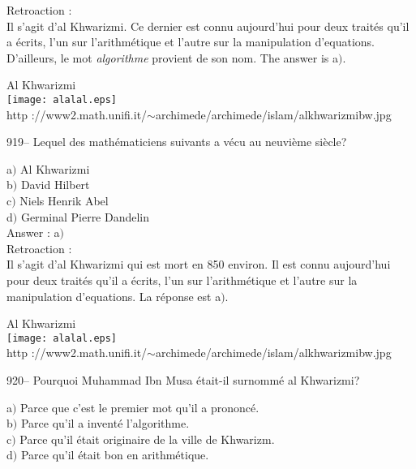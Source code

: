 ﻿\documentclass[letterpaper, 12pt]{article}
\begin{document}
Retroaction : \\
Il s'agit d'al Khwarizmi. Ce dernier est connu aujourd'hui pour deux
trait\'es qu'il a \'ecrits, l'un sur l'arithm\'etique et l'autre sur
la manipulation d'equations. D'ailleurs, le mot
{\sl algorithme} provient de son nom. The answer is a$)$.\\

        \begin{center}
        Al Khwarizmi\\
    \texttt{[image: alalal.eps]}\\
        {\footnotesize http
://www2.math.unifi.it/$\sim$archimede/archimede/islam/alkhwarizmibw.jpg}
    \end{center}

919-- Lequel des math\'ematiciens suivants a v\'ecu au neuvi\`eme
si\`ecle?

a$)$ Al Khwarizmi \\
b$)$ David Hilbert \\
c$)$ Niels Henrik Abel \\
d$)$ Germinal Pierre Dandelin\\

Answer : a$)$\\

Retroaction :  \\
Il s'agit d'al Khwarizmi qui est mort en 850 environ. Il est connu
aujourd'hui pour deux trait\'es qu'il a \'ecrits,
l'un sur l'arithm\'etique et l'autre sur la manipulation d'equations. La
r\'eponse est a$)$.\\

        \begin{center}
        Al Khwarizmi\\
    \texttt{[image: alalal.eps]}\\
        {\footnotesize http
://www2.math.unifi.it/$\sim$archimede/archimede/islam/alkhwarizmibw.jpg}
    \end{center}

920-- Pourquoi Muhammad Ibn Musa \'etait-il surnomm\'e al Khwarizmi?

a$)$ Parce que c'est le premier mot qu'il a prononc\'e. \\
b$)$ Parce qu'il a invent\'e l'algorithme. \\
c$)$ Parce qu'il \'etait originaire de la ville de Khwarizm. \\
d$)$ Parce qu'il \'etait bon en arithm\'etique.  \\
\end{document}
